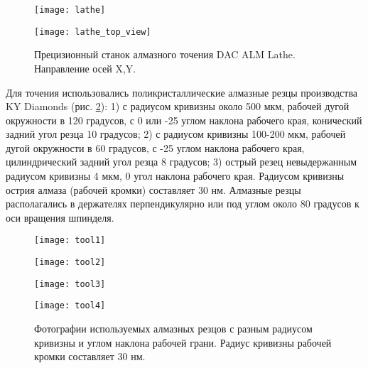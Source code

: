 \begin{figure}[ht]
  \begin{minipage}[ht]{0.49\linewidth}\centering
    \texttt{[image: lathe]}
  \end{minipage}
  \hfill
  \begin{minipage}[ht]{0.49\linewidth}\centering
    \texttt{[image: lathe\_top\_view]}
  \end{minipage}
  \caption{Прецизионный станок алмазного точения DAC ALM Lathe. Направление осей X,Y.}
  \label{lathe}
\end{figure}

Для точения использовались поликристаллические алмазные резцы производства KY Diamonds (рис. \ref{diamond_tools}): 1) с радиусом кривизны около 500 мкм, рабочей дугой окружности в 120 градусов, с 0 или -25 углом наклона рабочего края, конический задний угол резца 10 градусов; 2) с радиусом кривизны 100-200 мкм, рабочей дугой окружности в 60 градусов, с -25 углом наклона рабочего края, цилиндрический задний угол резца 8 градусов; 3) острый резец невыдержанным радиусом кривизны 4 мкм, 0 угол наклона рабочего края. Радиусом кривизны острия алмаза (рабочей кромки) составляет 30 нм. Алмазные резцы располагались в держателях перпендикулярно или под углом около 80 градусов к оси вращения шпинделя.

\begin{figure}[ht]
  \begin{minipage}[ht]{0.24\linewidth}\centering
    \texttt{[image: tool1]}
  \end{minipage}
  \hfill
  \begin{minipage}[ht]{0.24\linewidth}\centering
    \texttt{[image: tool2]}
  \end{minipage}
  \hfill
  \begin{minipage}[ht]{0.24\linewidth}\centering
    \texttt{[image: tool3]}
  \end{minipage}
  \hfill
  \begin{minipage}[ht]{0.24\linewidth}\centering
    \texttt{[image: tool4]}
  \end{minipage}
  \caption{Фотографии используемых алмазных резцов с разным радиусом кривизны и углом наклона рабочей грани. Радиус кривизны рабочей кромки составляет 30 нм.}
  \label{diamond_tools}
\end{figure}

